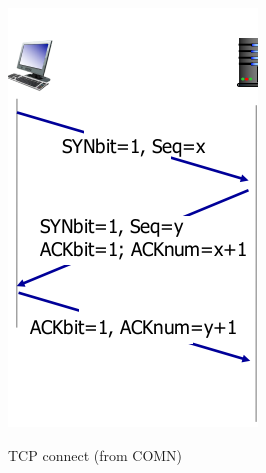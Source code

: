 \documentclass{article}
\begin{document}
\begin{figure}
    \centering
    \begin{subfigure}{0.3\textwidth}
        \centering
        \includegraphics[width=\textwidth]{figures/tcp_open.png}
        \label{fig:tcp_open}
        \caption{TCP connect (from COMN)}
    \end{subfigure}
    \hspace{20mm}
    \begin{subfigure}{0.55\textwidth}
        \raggedright

\end{subfigure}
\end{figure}
\end{document}
